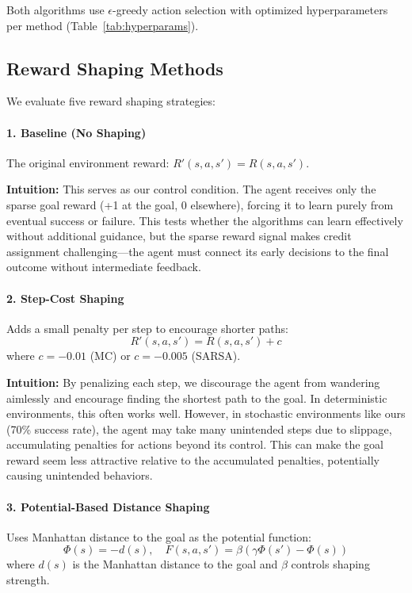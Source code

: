 \documentclass[11pt,a4paper]{article}
\begin{document}
Both algorithms use $\epsilon$-greedy action selection with optimized hyperparameters per method (Table~\ref{tab:hyperparams}).

\subsection{Reward Shaping Methods}

We evaluate five reward shaping strategies:

\paragraph{1. Baseline (No Shaping)} 
The original environment reward: $R'(s,a,s') = R(s,a,s')$.

\textbf{Intuition:} This serves as our control condition. The agent receives only the sparse goal reward (+1 at the goal, 0 elsewhere), forcing it to learn purely from eventual success or failure. This tests whether the algorithms can learn effectively without additional guidance, but the sparse reward signal makes credit assignment challenging---the agent must connect its early decisions to the final outcome without intermediate feedback.

\paragraph{2. Step-Cost Shaping}
Adds a small penalty per step to encourage shorter paths:
\begin{equation}
R'(s,a,s') = R(s,a,s') + c
\end{equation}
where $c = -0.01$ (MC) or $c = -0.005$ (SARSA).

\textbf{Intuition:} By penalizing each step, we discourage the agent from wandering aimlessly and encourage finding the shortest path to the goal. In deterministic environments, this often works well. However, in stochastic environments like ours (70\% success rate), the agent may take many unintended steps due to slippage, accumulating penalties for actions beyond its control. This can make the goal reward seem less attractive relative to the accumulated penalties, potentially causing unintended behaviors.

\paragraph{3. Potential-Based Distance Shaping}
Uses Manhattan distance to the goal as the potential function:
\begin{equation}
\Phi(s) = -d(s), \quad F(s,a,s') = \beta(\gamma\Phi(s') - \Phi(s))
\end{equation}
where $d(s)$ is the Manhattan distance to the goal and $\beta$ controls shaping strength.
\end{document}
